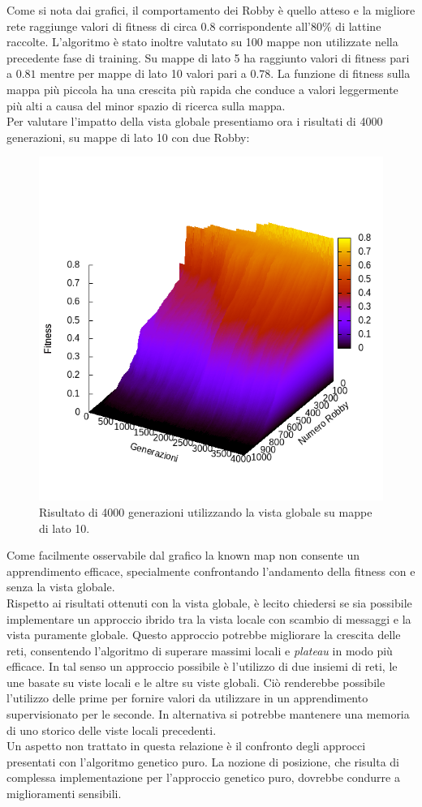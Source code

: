 Come si nota dai grafici, il comportamento dei Robby è quello atteso e la
migliore rete raggiunge valori di fitness di circa $0.8$ corrispondente
all'$80\%$ di lattine raccolte. L'algoritmo è stato inoltre valutato su 100 mappe
non utilizzate nella precedente fase di training. Su mappe di lato 5 ha
raggiunto valori di fitness pari a $0.81$ mentre per mappe di lato 10 valori
pari a $0.78$.  La funzione di fitness sulla mappa più piccola
ha una crescita più rapida che conduce a valori leggermente più alti a causa
del minor spazio di ricerca sulla mappa.\\

Per valutare l'impatto della vista globale presentiamo ora i risultati di 4000
generazioni, su mappe di lato 10 con due Robby:

\begin{figure}[H]
\centering
	\centering
	\includegraphics[width=.75\textwidth]{img/graph10x10.png}
\caption{Risultato di 4000 generazioni utilizzando la vista globale su mappe di lato 10.}
\end{figure}

Come facilmente osservabile dal grafico la known map non consente un
apprendimento efficace, specialmente confrontando l'andamento della fitness con
e senza la vista globale.\\

Rispetto ai risultati ottenuti con la vista globale, è lecito chiedersi se sia
possibile implementare un approccio ibrido tra la vista locale con scambio di
messaggi e la vista puramente globale. Questo approccio potrebbe migliorare la
crescita delle reti, consentendo l'algoritmo di superare massimi locali e
\emph{plateau} in modo più efficace. In tal senso un approccio possibile è
l'utilizzo di due insiemi di reti, le une basate su viste locali e le altre su
viste globali. Ciò renderebbe possibile l'utilizzo delle prime per fornire
valori da utilizzare in un apprendimento supervisionato per le seconde. In
alternativa si potrebbe mantenere una memoria di uno storico delle viste locali
precedenti.\\

Un aspetto non trattato in questa relazione è il confronto degli approcci
presentati con l'algoritmo genetico puro. La nozione di posizione, che
risulta di complessa implementazione per l'approccio genetico puro, dovrebbe
condurre a miglioramenti sensibili.
